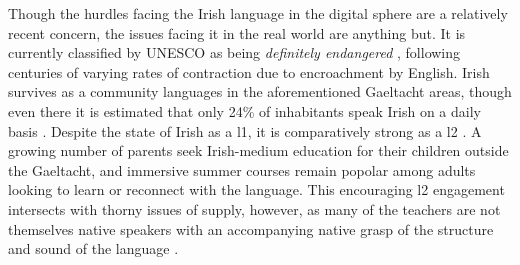 \documentclass[thesis]{cluu}
\begin{document}
Though the hurdles facing the Irish language in the digital sphere are a relatively recent concern, the issues facing it in the real world are anything but. It is currently classified by UNESCO as being \textit{definitely endangered} \parencite{moseleyAtlasWorldsLanguages2010}, following centuries of varying rates of contraction due to encroachment by English. Irish survives as a community languages in the aforementioned Gaeltacht areas, though even there it is estimated that only 24\% of inhabitants speak Irish on a daily basis \parencite{nichasaideSPEECHTECHNOLOGYDOCUMENTATION2015}. Despite the state of Irish as a \gls{l1}, it is comparatively strong as a \gls{l2} \parencite{broinNewUrbanIrish2014}. A growing number of parents seek Irish-medium education for their children outside the Gaeltacht, and immersive summer courses remain popolar among adults looking to learn or reconnect with the language. This encouraging \gls{l2} engagement intersects with thorny issues of supply, however, as many of the teachers are not themselves native speakers with an accompanying native grasp of the structure and sound of the language \parencite{nichasaideSPEECHTECHNOLOGYDOCUMENTATION2015,nichasaideCanWeDefuse2019}. 
\end{document}
